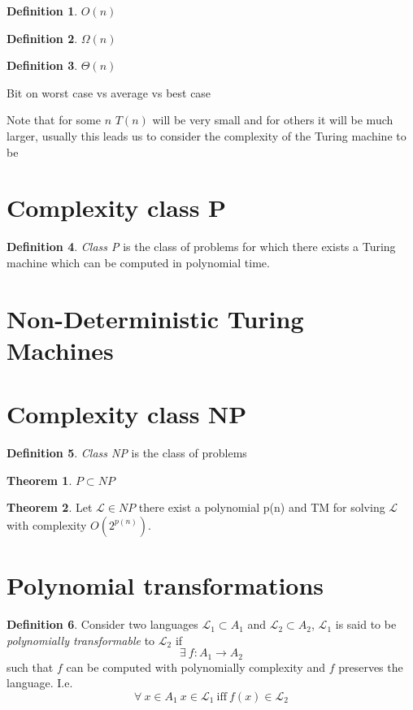 \documentclass{article}
\theoremstyle{definition}
\newtheorem{definition}{Definition}[section]
\newtheorem{theorem}{Theorem}[section]
\begin{document}
\begin{definition}
	$O(n)$
\end{definition}

\begin{definition}
	$\Omega(n)$
\end{definition}

\begin{definition}
	$\Theta(n)$
\end{definition}
Bit on worst case vs average vs best case

Note that for some $n$ $T(n)$ will be very small and for others it will be much larger,
usually this leads us to consider the complexity of the Turing machine to be 


\section{Complexity class P}
\begin{definition}
	\textit{Class P} is the class of problems for which there exists a Turing machine
	which can be computed in polynomial time.
\end{definition}

\section{Non-Deterministic Turing Machines}

\section{Complexity class NP}
\begin{definition}
	\textit{Class NP} is the class of problems 
\end{definition}

\begin{theorem}
	$P \subset NP$
\end{theorem}

\begin{theorem}
	Let $\mathcal{L} \in NP$ there exist a polynomial p(n) and TM
	for solving $\mathcal{L}$ with complexity $O(2^{p(n)})$.
\end{theorem}

\section{Polynomial transformations}
\begin{definition}
	Consider two languages $\mathcal{L_1} \subset A_1$ and $\mathcal{L_2} \subset A_2$,
	$\mathcal{L_1}$ is said to be \textit{polynomially transformable} to $\mathcal{L_2}$ if
	$$\exists\ f : A_1 \rightarrow A_2$$
	such that $f$ can be computed with polynomially complexity and $f$ preserves the language. I.e.
	$$\forall\ x \in A_1\ x \in \mathcal{L_1}\ \mathrm{iff}\ f(x)\in \mathcal{L_2}$$
\end{definition}
\end{document}
